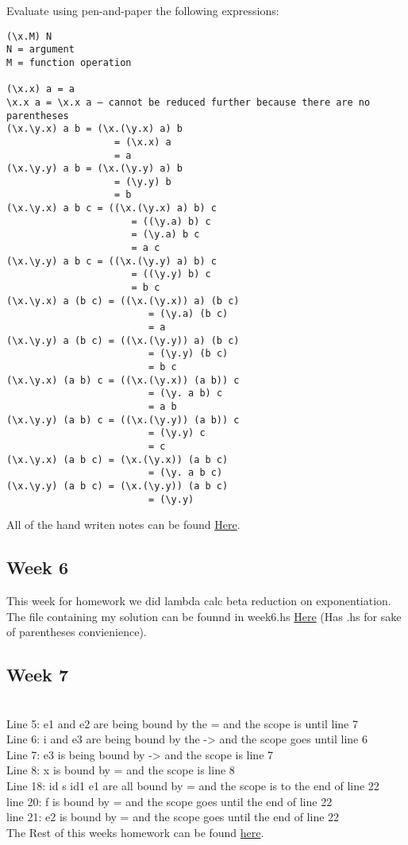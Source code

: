 \documentclass{article}
\theoremstyle{theorem}
\theoremstyle{definition}
\theoremstyle{remark}
\begin{document}
Evaluate using pen-and-paper the following expressions:
\begin{lstlisting}
(\x.M) N
N = argument
M = function operation

(\x.x) a = a
\x.x a = \x.x a — cannot be reduced further because there are no parentheses
(\x.\y.x) a b = (\x.(\y.x) a) b
                   = (\x.x) a
                   = a
(\x.\y.y) a b = (\x.(\y.y) a) b
                   = (\y.y) b
                   = b
(\x.\y.x) a b c = ((\x.(\y.x) a) b) c
                      = ((\y.a) b) c
                      = (\y.a) b c
                      = a c
(\x.\y.y) a b c = ((\x.(\y.y) a) b) c
                      = ((\y.y) b) c
                      = b c
(\x.\y.x) a (b c) = ((\x.(\y.x)) a) (b c)
                         = (\y.a) (b c)
                         = a
(\x.\y.y) a (b c) = ((\x.(\y.y)) a) (b c)
                         = (\y.y) (b c)
                         = b c
(\x.\y.x) (a b) c = ((\x.(\y.x)) (a b)) c
                         = (\y. a b) c
                         = a b
(\x.\y.y) (a b) c = ((\x.(\y.y)) (a b)) c
                         = (\y.y) c
                         = c
(\x.\y.x) (a b c) = (\x.(\y.x)) (a b c)
                         = (\y. a b c)
(\x.\y.y) (a b c) = (\x.(\y.y)) (a b c)
                         = (\y.y)
\end{lstlisting}

All of the hand writen notes can be found 
\href{https://github.com/alexhkurz/programming-languages-2022/blob/main/README.md}{Here}.

\subsection{Week 6}

This week for homework we did lambda calc beta reduction on exponentiation. The file containing my solution can be founnd in week6.hs \href{https://github.com/jacgoldberg/Programming-Lang/blob/main/week6.hs}{Here} (Has .hs for sake of parentheses convienience).

\subsection{Week 7}
\\Line 5: e1 and e2 are being bound by the = and the scope is until line 7
\\Line 6: i and e3 are being bound by the -> and the scope goes until line 6
\\Line 7: e3 is being bound by -> and the scope is line 7
\\Line 8: x is bound by = and the scope is line 8
\\Line 18: id s id1 e1 are all bound by = and the scope is to the end of line 22
\\line 20: f is bound by = and the scope goes until the end of line 22
\\line 21: e2 is bound by = and the scope goes until the end of line 22
\\The Rest of this weeks homework can be found \href{https://github.com/jacgoldberg/Programming-Lang/blob/main/Note%20Oct%2019%2C%202022.pdf}{here}.
\end{document}
